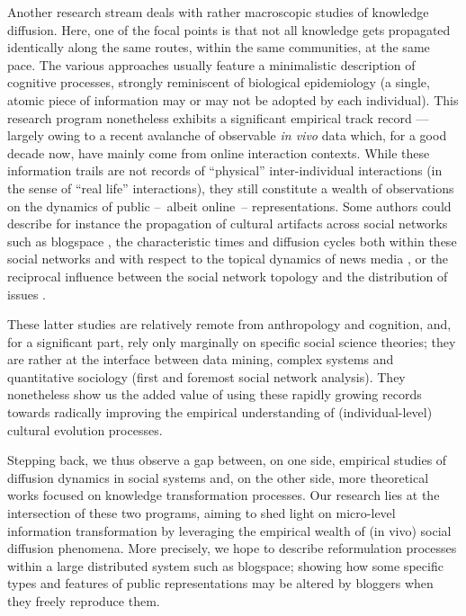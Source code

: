Another research stream deals with rather macroscopic studies of knowledge diffusion. Here, one of the focal points is that not all knowledge gets propagated identically along the same routes, within the same communities, at the same pace. The various approaches usually feature a minimalistic description of cognitive processes, strongly reminiscent of biological epidemiology (a single, atomic piece of information may or may not be adopted by each individual).  
This research program nonetheless exhibits a significant empirical track record --- largely owing to a recent avalanche of observable \emph{in vivo} data which, for a good decade now, have mainly come from online interaction contexts.
While these information trails are not records of ``physical'' inter-individual interactions (in the sense of ``real life'' interactions), they still constitute a wealth of observations on the dynamics of public --~albeit online~-- representations.
Some authors could describe for instance the propagation of cultural artifacts across social networks such as blogspace \citep{Gruhl04}, the characteristic times and diffusion cycles both within these social networks and with respect to the topical dynamics of news media \citep{Leskovec09}, or the reciprocal influence between the social network topology and the distribution of issues \citep{Cointet09}.

These latter studies are relatively remote from anthropology and cognition, and, for a significant part, rely only marginally on specific social science theories; they are rather at the interface between data mining, complex systems and quantitative sociology (first and foremost social network analysis). They nonetheless show us the added value of using these rapidly growing records %
towards radically improving the empirical understanding of (individual-level) cultural evolution processes.


\bigskip
Stepping back, we thus observe a gap between, on one side, empirical studies of diffusion dynamics in social systems and, on the other side, more theoretical works  focused on knowledge transformation processes. %
Our research lies at the intersection of these two programs, aiming to shed light on micro-level information transformation by leveraging the empirical wealth of (in vivo) social diffusion phenomena. More precisely, we hope to describe reformulation processes within a large distributed system such as blogspace; showing how some specific types and features of public representations may be altered by bloggers when they freely reproduce them.

